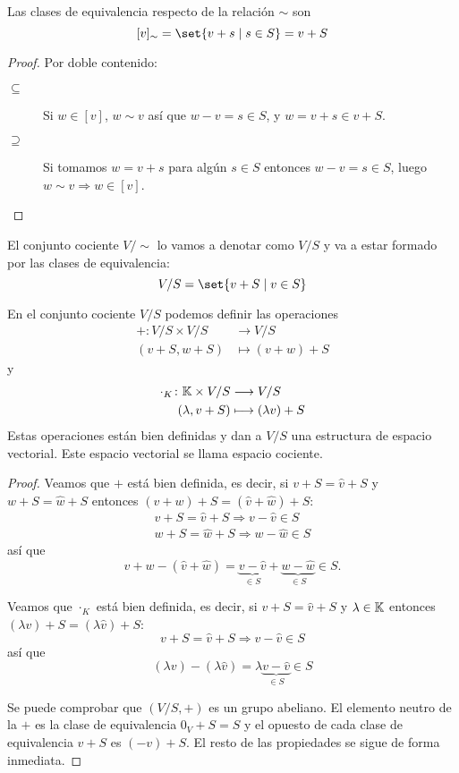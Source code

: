 \vspace{0.5cm}
\begin{proposition}
	Las clases de equivalencia respecto de la relación \(\sim \) son
	\[
		[v]_{\sim} = \set{v + s \mid s \in S} = v + S
	\]
\end{proposition}
\begin{proof}
	Por doble contenido:
	\begin{description}
		\item[\(\boxed{\subseteq}\)] Si \(w \in [v]\), \(w \sim v \) así que \(w - v = s \in S \), y \(w = v + s \in v + S \).
		\item[\(\boxed{\supseteq }\)] Si tomamos \(w = v + s \) para algún \(s \in S \) entonces \(w - v = s \in S \), luego \(w \sim v \Rightarrow w \in [v ]\).
	\end{description}
\end{proof}
El conjunto cociente \(V / \sim \) lo vamos a denotar como \(V / S \) y va a estar formado por las clases de equivalencia:
\[
	V / S = \set{v + S \mid v \in S }
\]
\begin{proposition}
	En el conjunto cociente \(V / S \) podemos definir las operaciones
	\[
		\begin{aligned}
			+ \colon V/S \times V / S & \longrightarrow V / S    \\
			(v +S, w + S )            & \longmapsto  (v + w) + S
		\end{aligned}
	\]
	y
	\[
		\begin{aligned}
			\cdot_K \colon \mathbb{K} \times V / S & \longrightarrow V / S        \\
			(\lambda, v + S )              & \longmapsto  (\lambda v) + S
		\end{aligned}
	\]
	Estas operaciones están bien definidas y dan a \(V / S \) una estructura de espacio vectorial. Este espacio vectorial se llama espacio cociente.
\end{proposition}
\begin{proof}
	Veamos que \(+ \) está bien definida, es decir, si \(v + S = \hat{v} + S \) y \(w + S = \hat{w} + S \) entonces \((v + w) + S = (\hat{v} + \hat{w}) + S \):
	\begin{align*}
		v + S = \hat{v} + S \Rightarrow v - \hat{v} \in S \\
		w + S = \hat{w} + S \Rightarrow w - \hat{w} \in S
	\end{align*}
	así que
	\[
		v + w - (\hat{v} + \hat{w}) = \underbrace{v - \hat{v}}_{\in S} + \underbrace{w - \hat{w}}_{\in  S} \in S.
	\]

	Veamos que \(\cdot_K \) está bien definida, es decir, si \(v + S = \hat{v} + S \) y \(\lambda \in \mathbb{K} \) entonces \((\lambda v) + S = (\lambda \hat{v}) + S\):
	\[
		v + S = \hat{v} + S \Rightarrow v - \hat{v} \in S
	\]
	así que
	\[
		(\lambda v) - (\lambda \hat{v}) = \lambda \underbrace{v - \hat{v}}_{\in S} \in S
	\]

	Se puede comprobar que \((V / S, + )\) es un grupo abeliano. El elemento neutro de la \(+ \) es la clase de equivalencia \(0_V + S = S \) y el opuesto de cada clase de equivalencia \(v + S \) es \((-v) + S \). El resto de las propiedades se sigue de forma inmediata.
\end{proof}
